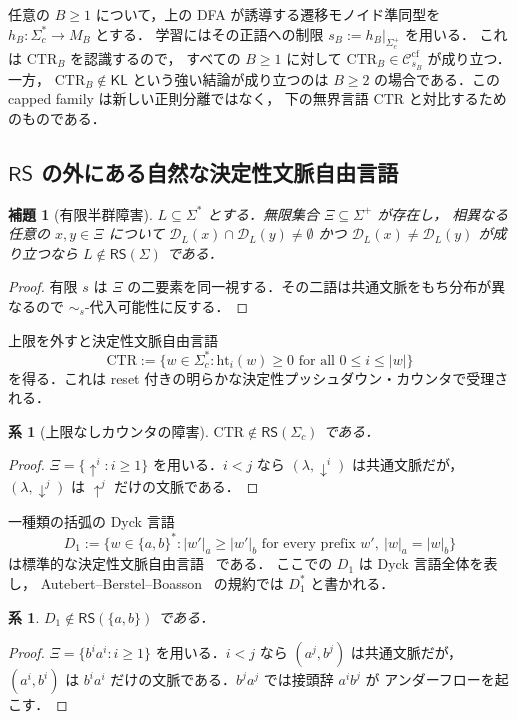 \documentclass[11pt,a4paper]{ltjsarticle}
\newtheorem{lemma}[theorem]{補題}
\newtheorem{corollary}[theorem]{系}
\theoremstyle{remark}
\theoremstyle{plain}
\newcommand{\D}{\mathcal{D}}
\newcommand{\cf}{\mathrm{cf}}
\newcommand{\Ccf}[1]{\mathcal C_{#1}^{\cf}}
\begin{document}
任意の $B\ge1$ について，上の DFA が誘導する遷移モノイド準同型を
$h_B:\Sigma_c^*\to M_B$ とする．
学習にはその正語への制限
$s_B:=h_B|_{\Sigma_c^+}$ を用いる．
これは $\mathrm{CTR}_B$ を認識するので，
すべての $B\ge1$ に対して
$\mathrm{CTR}_B\in\Ccf{s_B}$ が成り立つ．一方，
$\mathrm{CTR}_B\notin\mathsf{KL}$ という強い結論が成り立つのは
$B\ge2$ の場合である．この capped family は新しい正則分離ではなく，
下の無界言語 $\mathrm{CTR}$ と対比するためのものである．

\subsection{\texorpdfstring{$\mathsf{RS}$}{RS} の外にある自然な決定性文脈自由言語}\label{sec:outside-rs}

\begin{lemma}[有限半群障害]\label{lem:finite-monoid-obstruction}
$L\subseteq\Sigma^*$ とする．無限集合 $\Xi\subseteq\Sigma^+$ が存在し，
相異なる任意の $x,y\in\Xi$ について
$\D_L(x)\cap\D_L(y)\ne\emptyset$ かつ $\D_L(x)\ne\D_L(y)$ が成り立つなら
$L\notin\mathsf{RS}(\Sigma)$ である．
\end{lemma}
\begin{proof}
有限 $s$ は $\Xi$ の二要素を同一視する．その二語は共通文脈をもち分布が異なるので
$\sim_s$-代入可能性に反する．
\end{proof}

上限を外すと決定性文脈自由言語
\[
\mathrm{CTR}:=
\{w\in\Sigma_c^*: \mathrm{ht}_i(w)\ge0
\text{ for all }0\le i\le|w|\}
\]
を得る．これは reset 付きの明らかな決定性プッシュダウン・カウンタで受理される．

\begin{corollary}[上限なしカウンタの障害]
$\mathrm{CTR}\notin\mathsf{RS}(\Sigma_c)$ である．
\end{corollary}
\begin{proof}
$\Xi=\{\uparrow^i:i\ge1\}$ を用いる．$i<j$ なら
$(\lambda,\downarrow^i)$ は共通文脈だが，
$(\lambda,\downarrow^j)$ は $\uparrow^j$ だけの文脈である．
\end{proof}

一種類の括弧の Dyck 言語
\[
 D_1:=\{w\in\{a,b\}^*: |w'|_a\ge|w'|_b
 \text{ for every prefix }w',\ |w|_a=|w|_b\}
\]
は標準的な決定性文脈自由言語~\cite{ginsburg-greibach1966} である．
ここでの $D_1$ は Dyck 言語全体を表し，
Autebert--Berstel--Boasson~\cite{autebert1997} の規約では $D_1^*$ と書かれる．

\begin{corollary}\label{cor:dyck-not-rs}
$D_1\notin\mathsf{RS}(\{a,b\})$ である．
\end{corollary}
\begin{proof}
$\Xi=\{b^ia^i:i\ge1\}$ を用いる．$i<j$ なら $(a^j,b^j)$ は共通文脈だが，
$(a^i,b^i)$ は $b^ia^i$ だけの文脈である．$b^ja^j$ では接頭辞 $a^ib^j$ が
アンダーフローを起こす．
\end{proof}
\end{document}
